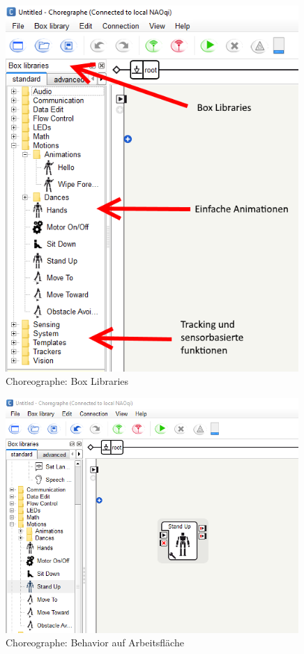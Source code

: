 \begin{appendix}
        \begin{figure}[ht]
            \centering
            \includegraphics[width=0.99\textwidth]{src/pictures/nao-choreo-boxlib.png}
            \caption{Choreographe: Box Libraries}
            \label{img:nao:choreo:boxlib}
        \end{figure}

        \begin{figure}[ht]
            \centering
            \includegraphics[width=0.99\textwidth]{src/pictures/nao-choreo-dad.png}
            \caption{Choreographe: Behavior auf Arbeitsfläche}
            \label{img:nao:choreo:draganddrop}
        \end{figure}


\end{appendix}
